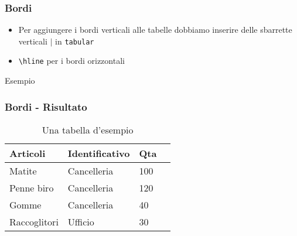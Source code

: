 \begin{frame}[fragile]
 
  \frametitle{Bordi}
  
  \begin{itemize}
   \item Per aggiungere i bordi verticali alle tabelle dobbiamo inserire 
delle sbarrette verticali $\vert$ in \texttt{tabular}
   \item \texttt{\textbackslash hline} per i bordi orizzontali
  \end{itemize}
  \begin{exampleblock}{Esempio}
    
  \end{exampleblock}
\end{frame}

\begin{frame}
 
 \frametitle{Bordi - Risultato}
 
 \begin{table}[h!]
\centering
\begin{tabular}{|l|l|l|l|}
\hline
Articoli      & Identificativo & Qta \\ \hline
Matite        & Cancelleria    & 100 \\ \hline
Penne biro    & Cancelleria    & 120 \\ \hline
Gomme         & Cancelleria    & 40  \\ \hline
Raccoglitori  & Ufficio        & 30  \\ \hline
\end{tabular}
\caption{Una tabella d'esempio}
\end{table}

\end{frame}
